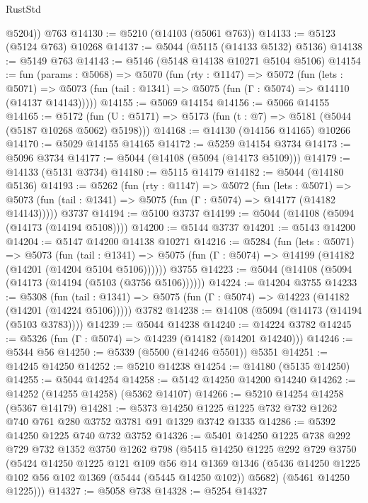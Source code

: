 \begin{lexlean}{RustStd}
\begin{coremodule}
        @5204))
    @763
@14130 := @5210 (@14103 (@5061 @763))
@14133 := @5123 (@5124 @763) @10268
@14137 := @5044 (@5115 (@14133 @5132) @5136)
@14138 := @5149 @763
@14143 := @5146 (@5148 @14138 @10271 @5104 @5106)
@14154 := fun (params : @5068) =>
  @5070
    (fun (rty : @1147) =>
    @5072
      (fun (lets : @5071) =>
      @5073 (fun (tail : @1341) => @5075 (fun (Γ : @5074) => @14110 (@14137 @14143)))))
@14155 := @5069 @14154
@14156 := @5066 @14155
@14165 := @5172
    (fun (U : @5171) => @5173 (fun (t : @7) => @5181 (@5044 (@5187 @10268 @5062) @5198)))
@14168 := @14130 (@14156 @14165) @10266
@14170 := @5029 @14155 @14165
@14172 := @5259 @14154 @3734
@14173 := @5096 @3734
@14177 := @5044 (@14108 (@5094 (@14173 @5109)))
@14179 := @14133 (@5131 @3734)
@14180 := @5115 @14179
@14182 := @5044 (@14180 @5136)
@14193 := @5262
    (fun (rty : @1147) =>
    @5072
      (fun (lets : @5071) =>
      @5073 (fun (tail : @1341) => @5075 (fun (Γ : @5074) => @14177 (@14182 @14143)))))
    @3737
@14194 := @5100 @3737
@14199 := @5044 (@14108 (@5094 (@14173 (@14194 @5108))))
@14200 := @5144 @3737
@14201 := @5143 @14200
@14204 := @5147 @14200 @14138 @10271
@14216 := @5284
    (fun (lets : @5071) =>
    @5073
      (fun (tail : @1341) =>
      @5075 (fun (Γ : @5074) => @14199 (@14182 (@14201 (@14204 @5104 @5106))))))
    @3755
@14223 := @5044 (@14108 (@5094 (@14173 (@14194 (@5103 (@3756 @5106))))))
@14224 := @14204 @3755
@14233 := @5308
    (fun (tail : @1341) => @5075 (fun (Γ : @5074) => @14223 (@14182 (@14201 (@14224 @5106)))))
    @3782
@14238 := @14108 (@5094 (@14173 (@14194 (@5103 @3783))))
@14239 := @5044 @14238
@14240 := @14224 @3782
@14245 := @5326 (fun (Γ : @5074) => @14239 (@14182 (@14201 @14240)))
@14246 := @5344 @56
@14250 := @5339 (@5500 (@14246 @5501)) @5351
@14251 := @14245 @14250
@14252 := @5210 @14238
@14254 := @14180 (@5135 @14250)
@14255 := @5044 @14254
@14258 := @5142 @14250 @14200 @14240
@14262 := @14252 (@14255 @14258) (@5362 @14107)
@14266 := @5210 @14254 @14258 (@5367 @14179)
@14281 := @5373 @14250 @1225 @1225 @732 @732 @1262 @740 @761 @280 @3752 @3781 @91 @1329 @3742 @1335
@14286 := @5392 @14250 @1225 @740 @732 @3752
@14326 := @5401
    @14250
    @1225
    @738
    @292
    @729
    @732
    @1352
    @3750
    @1262
    @798
    (@5415
      @14250
      @1225
      @292
      @729
      @3750
      (@5424
        @14250
        @1225
        @121
        @109
        @56
        @14
        @1369
        @1346
        (@5436 @14250 @1225 @102 @56 @102 @1369 (@5444 (@5445 @14250 @102)) @5682)
        (@5461 @14250 @1225)))
@14327 := @5058 @738
@14328 := @5254 @14327

\end{coremodule}
\end{lexlean}
